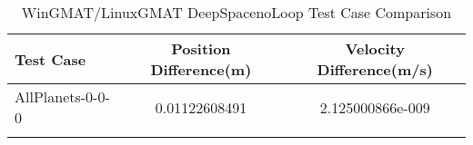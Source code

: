 \begin{table}[htbp!]
\centering
\caption{ WinGMAT/LinuxGMAT DeepSpacenoLoop Test Case Comparison}
      \begin{tabular}{lcc}
      \hline\hline
          Test Case & Position Difference(m) & Velocity Difference(m/s) \\
         \hline
         AllPlanets-0-0-0 & 0.01122608491 & 2.125000866e-009 \\
      \hline\hline
      \label{Table: DeepSpacenoLoop WinGMAT-LinuxGMAT Table} 
\end{tabular}
\end{table}
